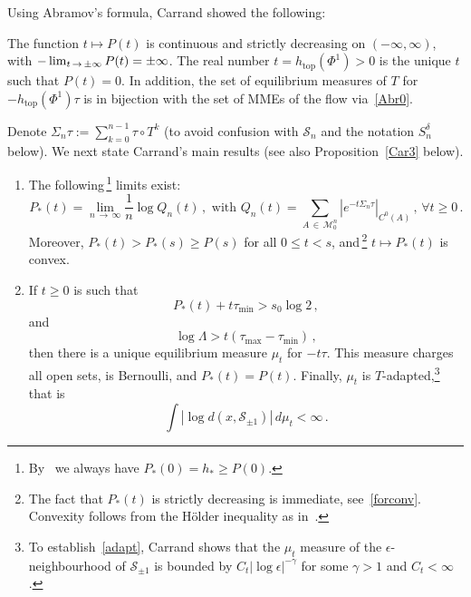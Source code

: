 \documentclass[AHL,Unicode,longabstracts,published]{cedram}
\newcommand{\MM}{\mathcal{M}}
\newcommand{\cS}{\mathcal{S}}
\newcommand{\htop}{h_{\scriptstyle{\text{top}}}}
\newcommand*{\alphenumi}{\renewcommand*{\theenumi}{\alph{enumi}}}
\let\oldforall\forall
\renewcommand*{\forall}{\mathrel{\oldforall}}
\newcommand{\htop}{h_{\scriptstyle{\text{top}}}}
\begin{document}
Using Abramov's formula, Carrand showed the following:


\begin{prop}\label{Car2}
The function $t\mapsto P(t)$ is continuous and strictly decreasing on $(-\infty, \infty)$, with $-\lim_{t\,\to\,\pm \infty}P(t)\linebreak =\pm\infty$. The real number $t=\htop(\Phi^1)>0$ is the unique $t$ such that $P(t)=0$. In addition, the set of equilibrium measures of $T$ for $-\htop(\Phi^1)\tau$ is in bijection with the set of MMEs of the flow via~\eqref{Abr0}.
\end{prop}


Denote $\Sigma_n \tau:=\sum_{k=0}^{n-1} \tau\circ T^k$ (to avoid confusion with $\cS_n$ and the notation $S^\delta_n$ below). We next state Carrand's main results (see also Proposition~\ref{Car3} below).

\begin{theo}\label{Car}\leavevmode
\begin{enumerate}\alphenumi
\item\label{theo1.2.a} The following\,\footnote{By~\cite{BD1} we always have $P_*(0)=h_*\ge P(0)$.} limits exist:
\[
P_*(t)=\lim_{n\,\to\,\infty} \frac 1 n \log Q_n(t)\,,
\text{ with } Q_n(t)= \sum_{A\,\in\,\MM_0^n} \left|e^{-t\Sigma_n \tau}\right|_{C^0(A)}\,,\,
\forall t\ge 0\,.
\]
Moreover, $P_*(t)> P_*(s)\ge P(s)$ for all $0\le t < s$, and\,\footnote{The fact that $P_*(t)$ is strictly decreasing is immediate, see~\eqref{forconv}. Convexity follows from the H\"older inequality as in~\cite[Proposition~2.6]{BD2}.} $t\mapsto P_*(t)$ is convex.

\item\label{theo1.2.b} If $t\ge 0$ is such that
\begin{equation}\label{sparse}
P_*(t)+ t \tau_{\min} > s_0 \log 2 \,,
\end{equation}
and
\begin{equation}\label{hassle}
\log \Lambda > t (\tau_{\max}-\tau_{\min})\,,
\end{equation}
then there is a unique equilibrium measure $\mu_t$ for $-t\tau$. This measure charges all open sets, is Bernoulli, and $P_*(t)=P(t)$. Finally, $\mu_t$ is $T$-adapted,\footnote{\label{foot:adapt}
To establish~\eqref{adapt}, Carrand shows that the $\mu_t$ measure of the $\epsilon$-neighbourhood of $\cS_{\pm 1}$ is bounded by $C_t |\log \epsilon|^{ - \gamma}$ for some $\gamma >1$ and $C_t<\infty$.} that is
\begin{equation}\label{adapt}
\int \left|\log d(x, \cS_{\pm 1})\right| \, d\mu_t<\infty\,.
\end{equation}
\end{enumerate}
\end{theo}
\end{document}
